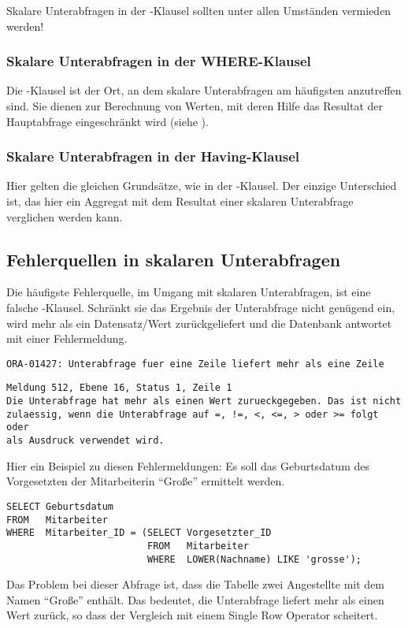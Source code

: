 \begin{merke}
    Skalare Unterabfragen in der \SELECT-Klausel sollten unter allen Umständen vermieden werden!
\end{merke}
\subsubsection{Skalare Unterabfragen in der WHERE-Klausel}
Die \WHERE-Klausel ist der Ort, an dem skalare Unterabfragen am häufigsten anzutreffen sind. Sie dienen zur Berechnung von Werten, mit deren Hilfe das Resultat der Hauptabfrage eingeschränkt wird (siehe ).
\subsubsection{Skalare Unterabfragen in der Having-Klausel}
Hier gelten die gleichen Grundsätze, wie in der \WHERE-Klausel. Der einzige Unterschied ist, das hier ein Aggregat mit dem Resultat einer skalaren Unterabfrage verglichen werden kann.
\subsection{Fehlerquellen in skalaren Unterabfragen}
Die häufigste Fehlerquelle, im Umgang mit skalaren Unterabfragen, ist eine falsche \WHERE-Klausel. Schränkt sie das Ergebnis der Unterabfrage nicht genügend ein, wird mehr als ein Datensatz/Wert zurückgeliefert und die Datenbank antwortet mit einer Fehlermeldung.
\begin{lstlisting}[language=oracle_sql,caption={Mehr als eine Zeile: Fehlermeldung in Oracle},label=sql06_04]
ORA-01427: Unterabfrage fuer eine Zeile liefert mehr als eine Zeile
          \end{lstlisting}
\begin{lstlisting}[language=ms_sql,caption={Mehr als eine Zeile: Fehlermeldung in SQL Server},label=sql06_05]
Meldung 512, Ebene 16, Status 1, Zeile 1
Die Unterabfrage hat mehr als einen Wert zurueckgegeben. Das ist nicht
zulaessig, wenn die Unterabfrage auf =, !=, <, <=, > oder >= folgt oder
als Ausdruck verwendet wird.
          \end{lstlisting}
Hier ein Beispiel zu diesen Fehlermeldungen: Es soll das Geburtsdatum des Vorgesetzten der Mitarbeiterin \enquote{Große} ermittelt werden.
\begin{lstlisting}[language=oracle_sql,caption={Eine Single Row Unterabfrage mit Problemen!},label=sql06_06]
SELECT Geburtsdatum
FROM   Mitarbeiter
WHERE  Mitarbeiter_ID = (SELECT Vorgesetzter_ID
                         FROM   Mitarbeiter
                         WHERE  LOWER(Nachname) LIKE 'grosse');
          \end{lstlisting}
Das Problem bei dieser Abfrage ist, dass die Tabelle  zwei Angestellte mit dem Namen \enquote{Große} enthält. Das bedeutet, die Unterabfrage liefert mehr als einen Wert zurück, so dass der Vergleich mit einem Single Row Operator scheitert.

